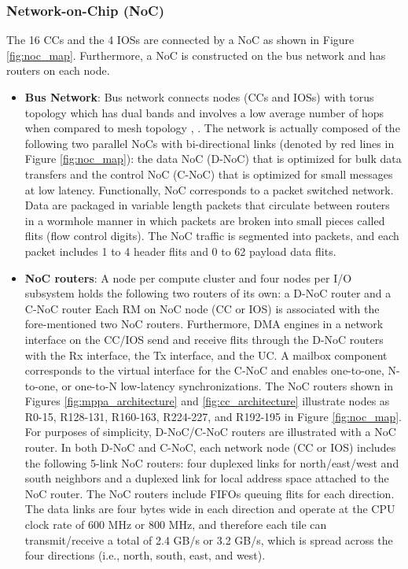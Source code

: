 \documentclass{sig-alternate-05-2015}
\begin{document}
\subsubsection{Network-on-Chip (NoC)}
\label{sec:noc}
The 16 CCs and the 4 IOSs are connected by a NoC as shown in Figure \ref{fig:noc_map}.
Furthermore, a NoC is constructed on the bus network and has routers on each node.

\begin{itemize}
\item \textbf{Bus Network}:
Bus network connects nodes (CCs and IOSs) with torus topology \cite{dally2001route}
which has dual bands and involves a low average number of hops when compared to mesh topology \cite{vangal200780}, \cite{taylor2002raw}.
The network is actually composed of the following two parallel NoCs with bi-directional links (denoted by red lines in Figure \ref{fig:noc_map}):
the data NoC (D-NoC) that is optimized for bulk data transfers and the control NoC (C-NoC) that is optimized for small messages at low latency.
Functionally, NoC corresponds to a packet switched network.
Data are packaged in variable length packets that circulate between routers in a wormhole manner in which packets are broken into small pieces called flits (flow control digits).
The NoC traffic is segmented into packets, and each packet includes 1 to 4 header flits and 0 to 62 payload data flits.

\item \textbf{NoC routers}:
A node per compute cluster and four nodes per I/O subsystem holds the following two routers of its
own: a D-NoC router and a C-NoC router
Each RM on NoC node (CC or IOS) is associated with the fore-mentioned two NoC routers.
Furthermore, DMA engines in a network interface on the CC/IOS send and receive flits through the D-NoC routers with the Rx interface, the Tx interface, and the UC.
A mailbox component corresponds to the virtual interface for the C-NoC and enables one-to-one, N-to-one, or one-to-N low-latency synchronizations.
The NoC routers shown in Figures \ref{fig:mppa_architecture} and \ref{fig:cc_architecture} illustrate nodes as R0-15, R128-131, R160-163, R224-227, and R192-195 in Figure \ref{fig:noc_map}.
For purposes of simplicity, D-NoC/C-NoC routers are illustrated with a NoC router.
In both D-NoC and C-NoC, each network node (CC or IOS)  includes the following 5-link NoC routers:
four duplexed links for north/east/west and south neighbors and a duplexed link for local address space attached to the NoC router.
The NoC routers include FIFOs queuing flits for each direction.
The data links are four bytes wide in each direction and operate at the CPU clock rate of 600 MHz or 800 MHz, and therefore each tile can transmit/receive a total of 2.4 GB/s or 3.2 GB/s, which is spread across the four directions (i.e., north, south, east, and west).
\end{itemize}
\end{document}
